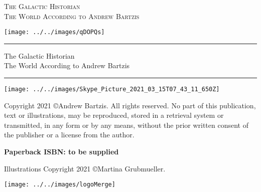 \documentclass[letterpaper,11pt,twoside,onecolumn,openany]{book}
\begin{document}
	
	
	
	\newpage
	\thispagestyle{empty}
	
	
	\begin{center}
		\huge{\textsc{The Galactic Historian}}\\
		\large{\textsc{The World According to Andrew Bartzis}}
	\end{center}

	
	\vspace{30mm}
	
	\begin{center}
		\texttt{[image: ../../images/qDOPQs]}
	\end{center}
	
	
	
	
	
	\newpage
	\thispagestyle{empty}
	\hrule
	
	\begin{center}
		
		
		
		\large{The Galactic Historian\\
			The World According to Andrew Bartzis}
		
	\end{center}
	
	\hrule
	
	\begin{center}
		\texttt{[image: ../../images/Skype\_Picture\_2021\_03\_15T07\_43\_11\_650Z]}
	\end{center}
	
	
	
	\begin{center}
		\noindent
		\small{Copyright 2021  \copyright Andrew Bartzis. All rights reserved.
			No part of this publication, text or illustrations, may be reproduced, stored in a retrieval system or transmitted, in any form or by any means, without the prior written consent of the publisher or a license from the author.}
		
		\textbf{Paperback ISBN: to be supplied}
		
		
		
		
		\small{Illustrations Copyright 2021  \copyright Martina Grubmueller.}
		
	\end{center}
	
	\vspace{5mm}
	
	
	\begin{center}
		\texttt{[image: ../../images/logoMerge]}
	\end{center}
	
\end{document}

